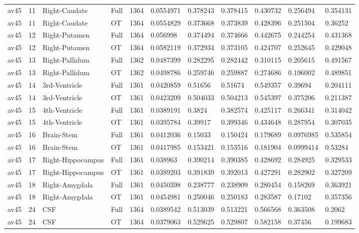 \begin{landscape}
\begin{longtable}{lllllllllll}
av45 & 11 & Right-Caudate & Full & 1364 & 0.0554971 & 0.378243 & 0.378415 & 0.430732 & 0.256494 & 0.354131 \\
av45 & 11 & Right-Caudate & OT & 1364 & 0.0554829 & 0.373668 & 0.373839 & 0.428396 & 0.251504 & 0.36252 \\
av45 & 12 & Right-Putamen & Full & 1364 & 0.056998 & 0.374494 & 0.374666 & 0.442675 & 0.244254 & 0.431368 \\
av45 & 12 & Right-Putamen & OT & 1364 & 0.0582119 & 0.372934 & 0.373105 & 0.424707 & 0.252645 & 0.429048 \\
av45 & 13 & Right-Pallidum & Full & 1362 & 0.0487399 & 0.282295 & 0.282442 & 0.310115 & 0.205615 & 0.491567 \\
av45 & 13 & Right-Pallidum & OT & 1362 & 0.0498786 & 0.259746 & 0.259887 & 0.274686 & 0.196002 & 0.489851 \\
av45 & 14 & 3rd-Ventricle & Full & 1361 & 0.0420859 & 0.51656 & 0.51674 & 0.549357 & 0.39694 & 0.204111 \\
av45 & 14 & 3rd-Ventricle & OT & 1361 & 0.0423209 & 0.504033 & 0.504213 & 0.545397 & 0.375206 & 0.211387 \\
av45 & 15 & 4th-Ventricle & Full & 1361 & 0.0389191 & 0.3824 & 0.382574 & 0.425117 & 0.266341 & 0.314042 \\
av45 & 15 & 4th-Ventricle & OT & 1361 & 0.0395784 & 0.39917 & 0.399346 & 0.434648 & 0.287954 & 0.307035 \\
av45 & 16 & Brain-Stem & Full & 1361 & 0.0412036 & 0.15033 & 0.150424 & 0.179689 & 0.0976985 & 0.535854 \\
av45 & 16 & Brain-Stem & OT & 1361 & 0.0417985 & 0.153421 & 0.153516 & 0.181904 & 0.0999414 & 0.53284 \\
av45 & 17 & Right-Hippocampus & Full & 1361 & 0.038963 & 0.390214 & 0.390385 & 0.428692 & 0.284925 & 0.329533 \\
av45 & 17 & Right-Hippocampus & OT & 1361 & 0.0389203 & 0.391839 & 0.392013 & 0.427291 & 0.282902 & 0.327209 \\
av45 & 18 & Right-Amygdala & Full & 1361 & 0.0450398 & 0.238777 & 0.238909 & 0.280454 & 0.158269 & 0.363921 \\
av45 & 18 & Right-Amygdala & OT & 1361 & 0.0454981 & 0.250046 & 0.250183 & 0.283587 & 0.17102 & 0.357356 \\
av45 & 24 & CSF & Full & 1364 & 0.0389542 & 0.513039 & 0.513221 & 0.566568 & 0.363508 & 0.2062 \\
av45 & 24 & CSF & OT & 1364 & 0.0379063 & 0.529625 & 0.529807 & 0.582158 & 0.37456 & 0.199683 \\

\end{longtable}
\end{landscape}
